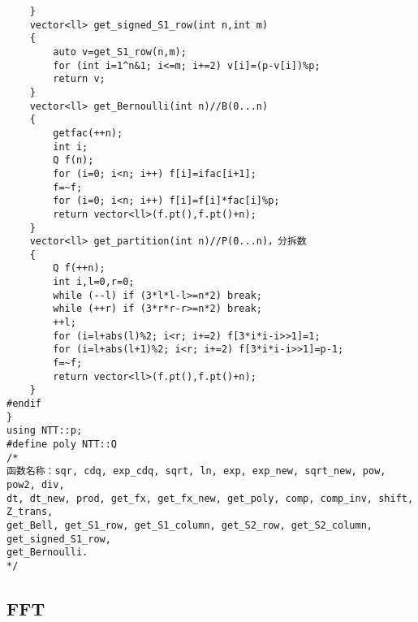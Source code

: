 \documentclass[12pt]{ctexart}
\begin{document}
\begin{lstlisting}
	}
	vector<ll> get_signed_S1_row(int n,int m)
	{
		auto v=get_S1_row(n,m);
		for (int i=1^n&1; i<=m; i+=2) v[i]=(p-v[i])%p;
		return v;
	}
	vector<ll> get_Bernoulli(int n)//B(0...n)
	{
		getfac(++n);
		int i;
		Q f(n);
		for (i=0; i<n; i++) f[i]=ifac[i+1];
		f=~f;
		for (i=0; i<n; i++) f[i]=f[i]*fac[i]%p;
		return vector<ll>(f.pt(),f.pt()+n);
	}
	vector<ll> get_partition(int n)//P(0...n)，分拆数
	{
		Q f(++n);
		int i,l=0,r=0;
		while (--l) if (3*l*l-l>=n*2) break;
		while (++r) if (3*r*r-r>=n*2) break;
		++l;
		for (i=l+abs(l)%2; i<r; i+=2) f[3*i*i-i>>1]=1;
		for (i=l+abs(l+1)%2; i<r; i+=2) f[3*i*i-i>>1]=p-1;
		f=~f;
		return vector<ll>(f.pt(),f.pt()+n);
	}
#endif
}
using NTT::p;
#define poly NTT::Q
/*
函数名称：sqr, cdq, exp_cdq, sqrt, ln, exp, exp_new, sqrt_new, pow, pow2, div,
dt, dt_new, prod, get_fx, get_fx_new, get_poly, comp, comp_inv, shift, Z_trans,
get_Bell, get_S1_row, get_S1_column, get_S2_row, get_S2_column, get_signed_S1_row,
get_Bernoulli.
*/
\end{lstlisting}

\subsection{FFT}
\end{document}
